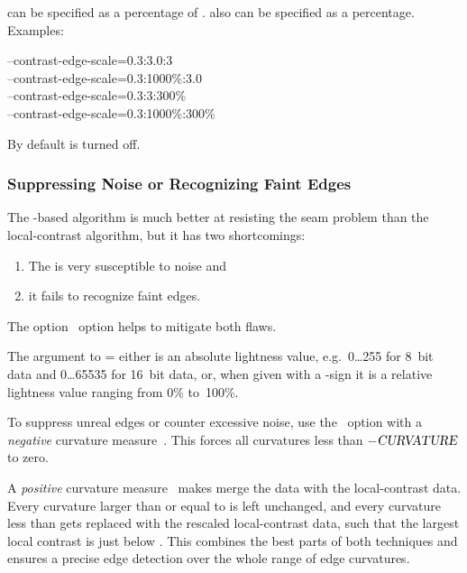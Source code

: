  can be specified as a percentage of
.   also can be specified as a
percentage.  Examples:

\begin{literal}
--contrast-edge-scale=0.3:3.0:3 \\
--contrast-edge-scale=0.3:1000\%:3.0 \\
--contrast-edge-scale=0.3:3:300\% \\
--contrast-edge-scale=0.3:1000\%:300\%
\end{literal}

By default  is turned off.


\subsubsection[Suppressing Noise or Recognizing Faint Edges]{Suppressing Noise or Recognizing Faint Edges
  \label{sec:suppressing-noise-or-recognizing-faint-edges}
  }

The -based algorithm is much better at resisting
the seam problem than the local-contrast algorithm, but it has two
shortcomings:
\begin{enumerate}
\item
  The  is very susceptible to noise and
\item
  it fails to recognize faint edges.
\end{enumerate}
\noindent The option~ option helps to
mitigate both flaws.

The argument to =
either is an absolute lightness value, e.g.\ 0\dots255 for 8~bit data
and 0\dots65535 for 16~bit data, or, when given with a
\sample{\%}-sign it is a relative lightness value ranging from 0\%
to~100\%.

To suppress unreal edges or counter excessive noise, use the
~option with a \emph{negative}
curvature measure~.  This forces all curvatures
less than $-\textsl{CURVATURE}$ to zero.

A \emph{positive} curvature measure~ makes \App{}
merge the  data with the local-contrast data.  Every
curvature larger than or equal to  is left
unchanged, and every curvature less than  gets
replaced with the rescaled local-contrast data, such that the largest
local contrast is just below .  This combines the
best parts of both techniques and ensures a precise edge detection
over the whole range of edge curvatures.

